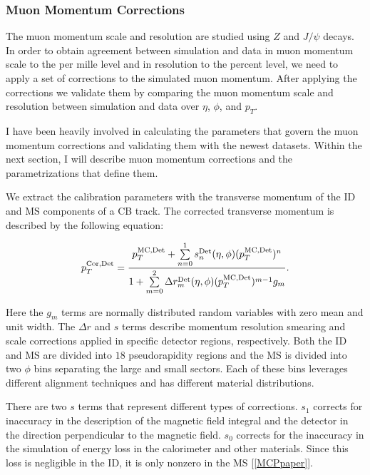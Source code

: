 \subsubsection{Muon Momentum Corrections} 
\par \hspace{20pt} The muon momentum scale and resolution are studied using $Z$ and $J/\psi$ decays. In order to obtain agreement between simulation and data in muon momentum scale to the per mille level and in resolution to the percent level, we need to apply a set of corrections to the simulated muon momentum. After applying the corrections we validate them by comparing the muon momentum scale and resolution between simulation and data over $\eta$, $\phi$, and $p_T$.

\par \hspace{20pt} I have been heavily involved in calculating the parameters that govern the muon momentum corrections and validating them with the newest datasets. Within the next section, I will describe muon momentum corrections and the parametrizations that define them.

\par \hspace{20pt} We extract the calibration parameters with the transverse momentum of the ID and MS components of a CB track.  The corrected transverse momentum is described by the following equation: 

\begin{align*}
	\centering 
    p_T^{\textrm{Cor,Det}} = \frac{p_T^{\textrm{MC,Det}}+\sum\limits_{n=0}^1s_n^{\textrm{Det}}(\eta,\phi)(p_T^{\textrm{MC,Det}})^n}{1+\sum\limits_{m=0}^2\Delta r_m^{\textrm{Det}}(\eta,\phi)(p_T^{\textrm{MC,Det}})^{m-1}g_m} .
\end{align*}
\par \hspace{20pt} Here the $g_m$ terms are normally distributed random variables with zero mean and unit width. The $\Delta r $ and $s$ terms describe momentum resolution smearing and scale corrections applied in specific detector regions, respectively. Both the ID and MS are divided into $18$ pseudorapidity regions and the MS is divided into two $\phi$ bins separating the large and small sectors. Each of these bins leverages different alignment techniques and has different material distributions. 

\par \hspace{20pt} There are two $s$ terms that represent different types of corrections. $s_1$ corrects for inaccuracy in the description of the magnetic field integral and the detector in the direction perpendicular to the magnetic field. $s_0$ corrects for the inaccuracy in the simulation of energy loss in the calorimeter and other materials. Since this loss is negligible in the ID, it is only nonzero in the MS [\ref{MCPpaper}].

